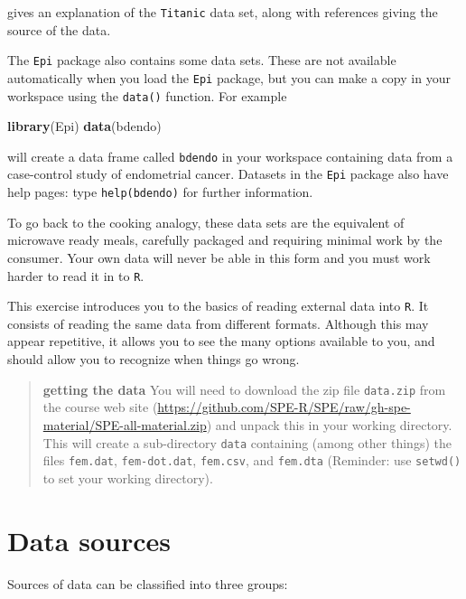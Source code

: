 \documentclass[
]{book}
\newenvironment{Shaded}{\begin{snugshade}}{\end{snugshade}}
\newcommand{\FunctionTok}[1]{\textcolor[rgb]{0.13,0.29,0.53}{\textbf{#1}}}
\newcommand{\NormalTok}[1]{#1}
\begin{document}
gives an explanation of the \texttt{Titanic} data set, along with
references giving the source of the data.

The \texttt{Epi} package also contains some data sets. These are not
available automatically when you load the \texttt{Epi} package, but
you can make a copy in your workspace using the \texttt{data()}
function. For example

\begin{Shaded}
\begin{Highlighting}[]
\FunctionTok{library}\NormalTok{(Epi)}
\FunctionTok{data}\NormalTok{(bdendo)}
\end{Highlighting}
\end{Shaded}

will create a data frame called \texttt{bdendo} in your workspace
containing data from a case-control study of endometrial cancer.
Datasets in the \texttt{Epi} package also have help pages: type
\texttt{help(bdendo)} for further information.

To go back to the cooking analogy, these data sets are the equivalent
of microwave ready meals, carefully packaged and requiring minimal
work by the consumer. Your own data will never be able in this form
and you must work harder to read it in to \texttt{R}.

This exercise introduces you to the basics of reading external data
into \texttt{R}. It consists of reading the same data from different
formats. Although this may appear repetitive, it allows you to see
the many options available to you, and should allow you to recognize
when things go wrong.

\begin{quote}
\textbf{getting the data} You will need to download the zip file \texttt{data.zip} from the course web site (\url{https://github.com/SPE-R/SPE/raw/gh-spe-material/SPE-all-material.zip}) and unpack this in your working directory. This will create a sub-directory \texttt{data} containing (among other things) the files \texttt{fem.dat}, \texttt{fem-dot.dat}, \texttt{fem.csv}, and \texttt{fem.dta} (Reminder: use \texttt{setwd()} to set
your working directory).
\end{quote}

\section{Data sources}\label{data-sources}

Sources of data can be classified into three groups:
\end{document}
